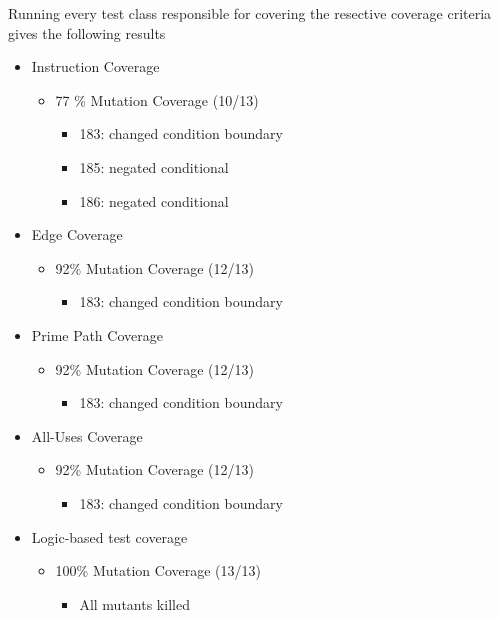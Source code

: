\documentclass[12pt]{article}
\begin{document}
Running every test class responsible for covering the resective coverage criteria gives the following results
\renewcommand{\labelitemi}{$\blacksquare$}
\renewcommand\labelitemii{$\square$}
 \begin{itemize}
   \item  Instruction Coverage
   \begin{itemize}
     \item {77 \% Mutation Coverage (10/13)}
     \begin{itemize}
       \item  183: changed condition boundary
	   \item  185: negated conditional
	   \item  186: negated conditional
     \end{itemize}
   \end{itemize}
   \item  Edge Coverage
   \begin{itemize}
     \item {92\% Mutation Coverage (12/13)}
     \begin{itemize}
       \item  183: changed condition boundary
     \end{itemize}
   \end{itemize}
   \item Prime Path Coverage
   \begin{itemize}
     \item {92\% Mutation Coverage (12/13)}
     \begin{itemize}
       \item  183: changed condition boundary
     \end{itemize}
   \end{itemize}
  \item All-Uses Coverage
   \begin{itemize}
     \item {92\% Mutation Coverage (12/13)}
     \begin{itemize}
       \item  183: changed condition boundary
     \end{itemize}
   \end{itemize}
   \item Logic-based test coverage
   \begin{itemize}
     \item {100\% Mutation Coverage (13/13)}
     \begin{itemize}
       \item  All mutants killed
     \end{itemize}
   \end{itemize}
 \end{itemize}
\end{document}
